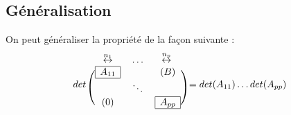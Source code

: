 \subsection{Généralisation}
\begin{prop}
On peut généraliser la propriété de la façon suivante : 
\[det ~ \begin{blockarray}{ccc}
	\overset{n_1}\leftrightarrow & \dots & \overset{n_p}\leftrightarrow \\
        \begin{block}{(ccc)}
         \mesbloc{A_{11}}  &  & (B)    \\
                          &\ddots  &        \\
         (0)                &  & \mesbloc{A_{pp}}   \\
        \end{block}
        \end{blockarray} = det(A_{11})\dots det(A_{pp})
\] 
\end{prop}